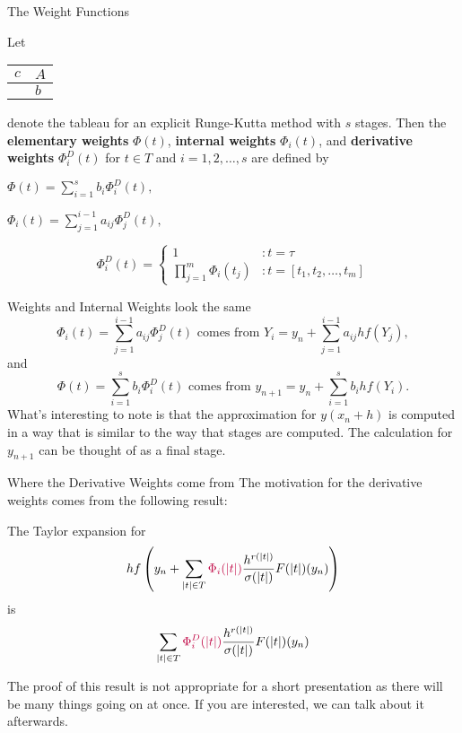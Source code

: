 \documentclass{beamer}
\def \purple{\textcolor{purple}}
\begin{document}
\begin{frame}{The Weight Functions}
\begin{definition}
Let
\noindent
\begin{center}
\begin{tabular}{r | l}
$c$ & $A$ \\ 
\hline 
  & $b$
\end{tabular}
\end{center}
denote the tableau for an explicit Runge-Kutta method with $s$ stages.
\pause
Then the \textbf{elementary weights} $\Phi(t)$, \textbf{internal weights} $\Phi_i(t)$,
and \textbf{derivative weights} $\Phi_i^D(t)$ for $t \in T$ and $i = 1, 2, \dots, s$
are defined by
\begin{multicols}{2}
\begin{center}
$\Phi(t) = \sum_{i = 1}^s{b_i\Phi_i^D(t)},$
\end{center} 
\columnbreak
\begin{center}
$\Phi_i(t) = \sum_{j = 1}^{i - 1}{a_{ij}\Phi_j^D(t)},$
\end{center}
\end{multicols}
$$\Phi_i^D(t) = \left\{ 
 \begin{array}{ll}
 1 & : t = \tau \\
 \prod_{j = 1}^m{\Phi_i(t_j)} & : t = \left[t_1, t_2, \dots, t_m \right]
 \end{array}
 \right.$$
\end{definition}
\end{frame}

\begin{frame}{Weights and Internal Weights look the same}
$$\Phi_i(t) = \sum_{j = 1}^{i - 1}{a_{ij}\Phi_j^D(t)}
\mbox{ comes from }
Y_i = y_n + \sum_{j = 1}^{i - 1}{a_{ij}hf(Y_j)},$$
and
$$\Phi(t) = \sum_{i = 1}^s{b_i\Phi_i^D(t)}
\mbox{ comes from }
y_{n+1} = y_n + \sum_{i = 1}^{s}{b_ihf(Y_i)}.$$
What's interesting to note is that the approximation for $y(x_n + h)$ is computed in a way that is
similar to the way that stages are computed. The calculation for $y_{n + 1}$ can be thought of as 
a final stage.
\end{frame}

\begin{frame}{Where the Derivative Weights come from}
The motivation for the derivative weights comes from the following result:
\begin{lemma}
The Taylor expansion for
$$hf\left(y_n + \sum_{|t| \in T}{\purple{\Phi_i(|t|)}\frac{h^{r(|t|)}}{\sigma(|t|)}F(|t|)(y_n) }\right)$$
is
$$\sum_{|t| \in T}{\purple{\Phi_i^D(|t|)}\frac{h^{r(|t|)}}{\sigma(|t|)}F(|t|)(y_n) }$$
\end{lemma}

The proof of this result is not appropriate for a short presentation as there will be many things 
going on at once. If you are interested, we can talk about it afterwards.
\end{frame}
\end{document}
